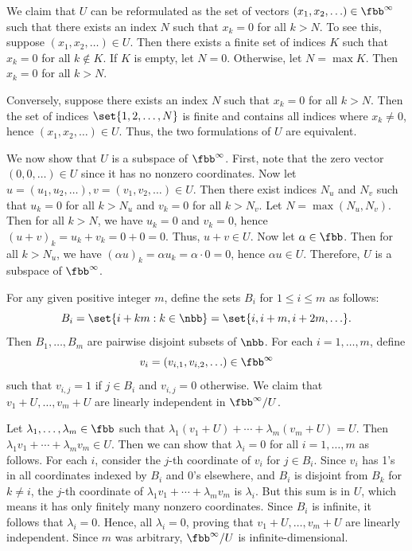 \begin{solenum}
    \item We claim that $U$ can be reformulated as the set of vectors $(x_1, x_2, \ldots) \in \fbb^\infty$ such that there exists an index $N$ such that $x_k = 0$ for all $k > N$.
	To see this, suppose $(x_1, x_2, \ldots) \in U$.
	Then there exists a finite set of indices $K$ such that $x_k = 0$ for all $k \notin K$.
	If $K$ is empty, let $N = 0$.
	Otherwise, let $N = \max K$.
	Then $x_k = 0$ for all $k > N$.
	
	Conversely, suppose there exists an index $N$ such that $x_k = 0$ for all $k > N$.
	Then the set of indices $\set{1, 2, \ldots, N}$ is finite and contains all indices where $x_k \neq 0$, hence $(x_1, x_2, \ldots) \in U$.
	Thus, the two formulations of $U$ are equivalent.
    
    We now show that $U$ is a subspace of $\fbb^\infty$.
	First, note that the zero vector $(0, 0, \ldots) \in U$ since it has no nonzero coordinates.
	Now let $u = (u_1, u_2, \ldots), v = (v_1, v_2, \ldots) \in U$.
	Then there exist indices $N_u$ and $N_v$ such that $u_k = 0$ for all $k > N_u$ and $v_k = 0$ for all $k > N_v$.
	Let $N = \max(N_u, N_v)$.
	Then for all $k > N$, we have $u_k = 0$ and $v_k = 0$, hence $(u + v)_k = u_k + v_k = 0 + 0 = 0$.
	Thus, $u + v \in U$.
	Now let $\alpha \in \fbb$.
	Then for all $k > N_u$, we have $(\alpha u)_k = \alpha u_k = \alpha \cdot 0 = 0$, hence $\alpha u \in U$.
	Therefore, $U$ is a subspace of $\fbb^\infty$.
    \item For any given positive integer $m$, define the sets $B_i$ for $1 \leq i \leq m$ as follows:
    \[
    	B_i = \set{i + km : k \in \nbb} = \set{i, i + m, i + 2m, \ldots}.
    \]
    Then $B_1, \ldots, B_m$ are pairwise disjoint subsets of $\nbb$.
	For each $i = 1, \ldots, m$, define
	\[
		v_i = (v_{i, 1}, v_{i, 2}, \ldots) \in \fbb^\infty
	\]
	such that $v_{i, j} = 1$ if $j \in B_i$ and $v_{i, j} = 0$ otherwise.
	We claim that $v_1 + U, \ldots, v_m + U$ are linearly independent in $\fbb^\infty / U$.
    
    Let $\lambda_1, \ldots, \lambda_m \in \fbb$ such that $\lambda_1 (v_1 + U) + \cdots + \lambda_m (v_m + U) = U$.
	Then $\lambda_1 v_1 + \cdots + \lambda_m v_m \in U$.
	Then we can show that $\lambda_i = 0$ for all $i = 1, \ldots, m$ as follows.
	For each $i$, consider the $j$-th coordinate of $v_i$ for $j \in B_i$.
	Since $v_i$ has 1's in all coordinates indexed by $B_i$ and 0's elsewhere, and $B_i$ is disjoint from $B_k$ for $k \neq i$, the $j$-th coordinate of $\lambda_1 v_1 + \cdots + \lambda_m v_m$ is $\lambda_i$.
	But this sum is in $U$, which means it has only finitely many nonzero coordinates.
	Since $B_i$ is infinite, it follows that $\lambda_i = 0$.
	Hence, all $\lambda_i = 0$, proving that $v_1 + U, \ldots, v_m + U$ are linearly independent.
	Since $m$ was arbitrary, $\fbb^\infty / U$ is infinite-dimensional.
\end{solenum}

